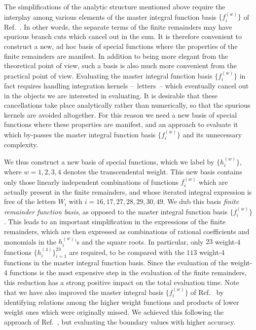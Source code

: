 \documentclass[main.tex]{subfiles}
\begin{document}
The simplifications of the analytic structure mentioned above require the interplay among various elements of the master integral function basis $\{f^{(w)}_i\}$ of Ref.~\cite{Badger:2021nhg}. In other words, the separate terms of the finite remainders may have spurious branch cuts which cancel out in the sum. It is therefore convenient to construct a new, ad hoc basis of special functions where the properties of the finite remainders are manifest. In addition to being more elegant from the theoretical point of view, such a basis is also much more convenient from the practical point of view. Evaluating the master integral function basis $\{f^{(w)}_i\}$ in fact requires handling integration kernels --~letters~-- which eventually cancel out in the objects we are interested in evaluating. It is desirable that these cancellations take place analytically rather than numerically, so that the spurious kernels are avoided altogether. For this reason we need a new basis of special functions where these properties are manifest, and an approach to evaluate it which by-passes the master integral function basis $\{f^{(w)}_i\}$ and its unnecessary complexity.

We thus construct a new basis of special functions, which we label by $\{h^{(w)}_i\}$, where $w=1,2,3,4$ denotes the transcendental weight. This new basis contains only those linearly independent combinations of functions $f^{(w)}_i$ which are actually present in the finite remainders, and whose iterated integral expression is free of the letters $W_i$ with $i=16,17,27,28,29,30,49$. We dub this basis \textit{finite remainder function basis}, as opposed to the master integral function basis $\{f^{(w)}_i\}$. This leads to an important simplification in the expressions of the finite remainders, which are then expressed as combinations of rational coefficients and monomials in the $h^{(w)}_i$'s and the square roots. In particular, only $23$ weight-4 functions $\{h^{(4)}_i\}_{i=1}^{23}$ are required, to be compared with the $113$ weight-4 functions in the master integral function basis. Since the evaluation of the weight-4 functions is the most expensive step in the evaluation of the finite remainders, this reduction has a strong positive impact on the total evaluation time. Note that we have also improved the master integral basis $\{f^{(w)}_i\}$ of Ref.~\cite{Badger:2021nhg} by identifying relations among the higher weight functions and products of lower weight ones which were originally missed. We achieved this following the approach of Ref.~\cite{Badger:2021nhg}, but evaluating the boundary values with higher accuracy.
\end{document}
